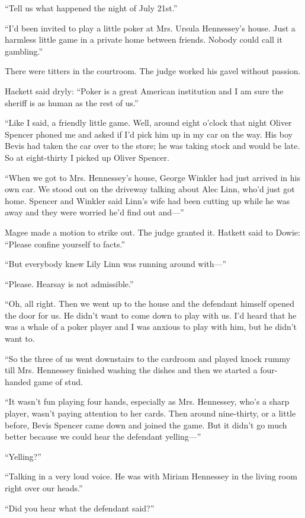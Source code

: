 \documentclass{novel}
\begin{document}
“Tell us what happened the night of July 21st.”

“I’d been invited to play a little poker at Mrs. Ursula Hennessey’s house. Just a harmless little game in a private home between friends. Nobody could call it gambling.”

There were titters in the courtroom. The judge worked his gavel without passion.

Hackett said dryly: “Poker is a great American institution and I am sure the sheriff is as human as the rest of us.”

“Like I said, a friendly little game. Well, around eight o’clock that night Oliver Spencer phoned me and asked if I’d pick him up in my car on the way. His boy Bevis had taken the car over to the store; he was taking stock and would be late. So at eight-thirty I picked up Oliver Spencer. 

“When we got to Mrs. Hennessey’s house, George Winkler had just arrived in his own car. We stood out on the driveway talking about Alec Linn, who’d just got home. Spencer and Winkler said Linn’s wife had been cutting up while he was away and they were worried he’d find out and—”

Magee made a motion to strike out. The judge granted it. Hatkett said to Dowie: “Please confine yourself to facts.”

“But everybody knew Lily Linn was running around with—”

“Please. Hearsay is not admissible.”

“Oh, all right. Then we went up to the house and the defendant himself opened the door for us. He didn’t want to come down to play with us. I’d heard that he was a whale of a poker player and I was anxious to play with him, but he didn’t want to. 

“So the three of us went downstairs to the cardroom and played knock rummy till Mrs. Hennessey finished washing the dishes and then we started a four-handed game of stud. 

“It wasn’t fun playing four hands, especially as Mrs. Hennessey, who’s a sharp player, wasn’t paying attention to her cards. Then around nine-thirty, or a little before, Bevis Spencer came down and joined the game. But it didn’t go much better because we could hear the defendant yelling—”

“Yelling?”

“Talking in a very loud voice. He was with Miriam Hennessey in the living room right over our heads.”

“Did you hear what the defendant said?”
\end{document}
